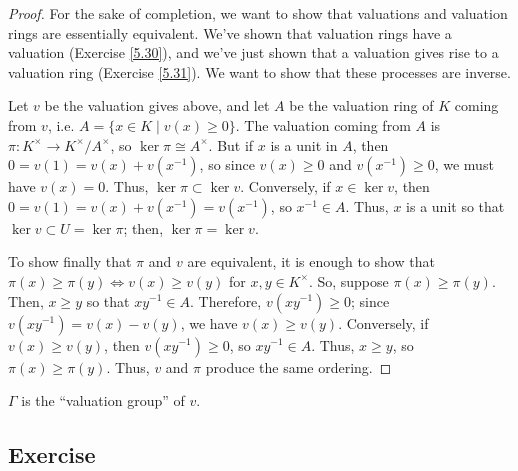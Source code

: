 \begin{proof}
For the sake of completion, we want to show that valuations and valuation rings are essentially equivalent. We've shown that valuation rings have a valuation 
(Exercise \ref{5.30}), and we've just shown that a valuation gives rise to a valuation ring (Exercise \ref{5.31}). We want to show that these processes are inverse.

Let $v$ be the valuation gives above, and let $A$ be the valuation ring of $K$ coming from $v$, i.e. $A = \{x \in K \mid v(x) \ge 0\}$. The valuation coming from $A$ is
$\pi : K^{\times} \to K^{\times} / A^{\times}$, so $\ker \pi \cong A^{\times}$. But if $x$ is a unit in $A$, then $0 = v(1) = v(x) + v(x^{-1})$, so since $v(x) \ge 0$ and 
$v(x^{-1}) \ge 0$, we must have $v(x) = 0$. Thus, $\ker \pi \subset \ker v$. Conversely, if $x \in \ker v$, then $0 = v(1) = v(x) + v(x^{-1}) = v(x^{-1})$, so $x^{-1} \in A$. 
Thus, $x$ is a unit so that $\ker v \subset U = \ker \pi$; then, $\ker \pi = \ker v$.

To show finally that $\pi$ and $v$ are equivalent, it is enough to show that $\pi(x) \ge \pi(y) \iff v(x) \ge v(y)$ for $x,y\in K^{\times}$. So, suppose $\pi(x) \ge \pi(y)$.
Then, $x \ge y$ so that $xy^{-1} \in A$. Therefore, $v(xy^{-1}) \ge 0$; since $v(xy^{-1}) = v(x) - v(y)$, we have $v(x) \ge v(y)$. Conversely, if $v(x) \ge v(y)$, then
$v(xy^{-1}) \ge 0$, so $xy^{-1} \in A$. Thus, $x \ge y$, so $\pi(x) \ge \pi(y)$. Thus, $v$ and $\pi$ produce the same ordering.
\end{proof}

\begin{remark}
$\Gamma$ is the ``valuation group'' of $v$.
\end{remark}

\subsection{Exercise}\label{5.32}

